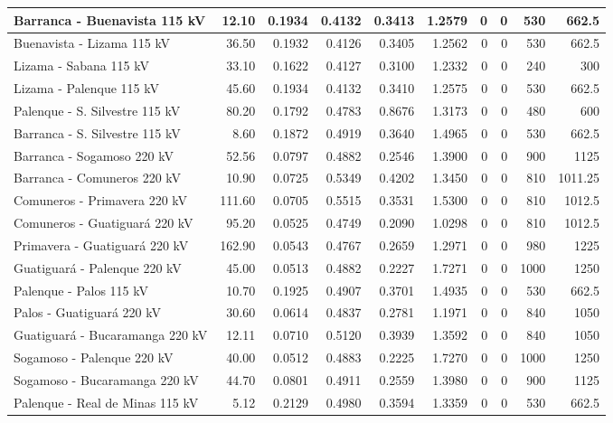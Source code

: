 \begin{center}
\begin{longtable}{|p{5.8cm}|r|r|r|r|r|r|r|r|r|}
\hline
\endlastfoot

\hline
\endlastfoot

Barranca - Buenavista 115 kV & 12.10 & 0.1934 & 0.4132 & 0.3413 & 1.2579 & 0 & 0 & 530 & 662.5 \\
\hline
Buenavista - Lizama 115 kV & 36.50 & 0.1932 & 0.4126 & 0.3405 & 1.2562 & 0 & 0 & 530 & 662.5 \\
\hline
Lizama - Sabana 115 kV & 33.10 & 0.1622 & 0.4127 & 0.3100 & 1.2332 & 0 & 0 & 240 & 300 \\
\hline
Lizama - Palenque 115 kV & 45.60 & 0.1934 & 0.4132 & 0.3410 & 1.2575 & 0 & 0 & 530 & 662.5 \\
\hline
Palenque - S. Silvestre 115 kV & 80.20 & 0.1792 & 0.4783 & 0.8676 & 1.3173 & 0 & 0 & 480 & 600 \\
\hline
Barranca - S. Silvestre 115 kV & 8.60 & 0.1872 & 0.4919 & 0.3640 & 1.4965 & 0 & 0 & 530 & 662.5 \\
\hline
Barranca - Sogamoso 220 kV & 52.56 & 0.0797 & 0.4882 & 0.2546 & 1.3900 & 0 & 0 & 900 & 1125 \\
\hline
Barranca - Comuneros 220 kV & 10.90 & 0.0725 & 0.5349 & 0.4202 & 1.3450 & 0 & 0 & 810 & 1011.25 \\
\hline
Comuneros - Primavera 220 kV & 111.60 & 0.0705 & 0.5515 & 0.3531 & 1.5300 & 0 & 0 & 810 & 1012.5 \\
\hline
Comuneros - Guatiguará 220 kV & 95.20 & 0.0525 & 0.4749 & 0.2090 & 1.0298 & 0 & 0 & 810 & 1012.5 \\
\hline
Primavera - Guatiguará 220 kV & 162.90 & 0.0543 & 0.4767 & 0.2659 & 1.2971 & 0 & 0 & 980 & 1225 \\
\hline
Guatiguará - Palenque 220 kV & 45.00 & 0.0513 & 0.4882 & 0.2227 & 1.7271 & 0 & 0 & 1000 & 1250 \\
\hline
Palenque - Palos 115 kV & 10.70 & 0.1925 & 0.4907 & 0.3701 & 1.4935 & 0 & 0 & 530 & 662.5 \\
\hline
Palos - Guatiguará 220 kV & 30.60 & 0.0614 & 0.4837 & 0.2781 & 1.1971 & 0 & 0 & 840 & 1050 \\
\hline
Guatiguará - Bucaramanga 220 kV & 12.11 & 0.0710 & 0.5120 & 0.3939 & 1.3592 & 0 & 0 & 840 & 1050 \\
\hline
Sogamoso - Palenque 220 kV & 40.00 & 0.0512 & 0.4883 & 0.2225 & 1.7270 & 0 & 0 & 1000 & 1250 \\
\hline
Sogamoso - Bucaramanga 220 kV & 44.70 & 0.0801 & 0.4911 & 0.2559 & 1.3980 & 0 & 0 & 900 & 1125 \\
\hline
Palenque - Real de Minas 115 kV & 5.12 & 0.2129 & 0.4980 & 0.3594 & 1.3359 & 0 & 0 & 530 & 662.5 \\

\end{longtable}
\end{center}

